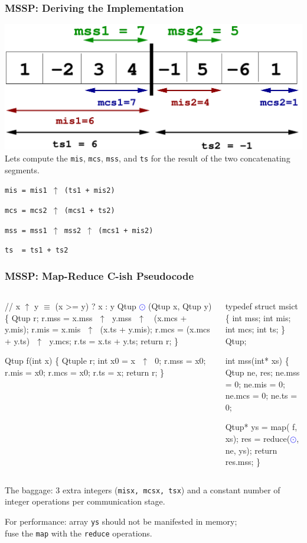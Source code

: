 \documentclass{beamer}
\newcommand{\blue}[1]{\textcolor{Blue}{{#1}}}
\renewcommand{\emph}[1]{\textcolor{CosGreen}{ #1}}
\newcommand{\emp}[1]{\textcolor{DikuRed}{ #1}}
\newcommand{\mymath}[1]{$ #1 $}
\begin{document}
\begin{frame}[fragile,t]
  \frametitle{MSSP: Deriving the Implementation}

\includegraphics[height=22ex]{img/day3/mssp2}
\medskip
Lets compute the {\tt mis}, {\tt mcs}, {\tt mss}, and {\tt ts} for
the result of the two concatenating segments.

\bigskip
{\tt mis = \pause mis1 $\uparrow$ (ts1 + mis2)}
\medskip

{\tt mcs = \pause mcs2 $\uparrow$ (mcs1 + ts2)}
\medskip

{\tt mss = \pause mss1 $\uparrow$ mss2 $\uparrow$ (mcs1 + mis2)}
\medskip

{\tt ts~~= ts1 + ts2}
\end{frame}


\begin{frame}[fragile,t]
  \frametitle{MSSP: Map-Reduce C-ish Pseudocode}

\begin{columns}
\begin{colorcode}
// x \mymath{\uparrow} y \mymath{\equiv} (x >= y) ? x : y
Qtup \blue{\mymath{\odot}} (Qtup x, Qtup y) \{
    Qtup r;
    r.mss = x.mss\mymath{\mbox{ }\uparrow\mbox{ }}y.mss\mymath{\mbox{ }\uparrow\mbox{ }}
            (x.mcs + y.mis);
    r.mis = x.mis\mymath{\mbox{ }\uparrow\mbox{ }}(x.ts + y.mis);
    r.mcs = (x.mcs + y.ts)\mymath{\mbox{ }\uparrow\mbox{ }}y.mcs;
    r.ts  = x.ts + y.ts;
    return r;
\}

Qtup \emp{f}(int x) \{
    Qtuple r;
    int x0 = x\mymath{\mbox{ }\uparrow\mbox{ }}0;
    r.mss = x0; r.mis = x0;
    r.mcs = x0; r.ts = x;
    return r;
\}
\end{colorcode}
\begin{colorcode}
typedef struct msict \{
  int mss;
  int mis;
  int mcs;
  int ts;
\} Qtup;

int mss(int* xs) \{
    Qtup ne, res; 
    ne.mss = 0; ne.mis = 0;
    ne.mcs = 0; ne.ts  = 0;
    
    Qtup* ys = \emph{map}(\emp{f}, xs);
    res = \emph{reduce}(\blue{\mymath{\odot}}, ne, ys);
    return res.mss;
\}
\end{colorcode}
\end{columns}
\smallskip

The baggage: $3$ extra integers ({\tt misx, mcsx, tsx}) 
and a constant number of integer operations per communication stage. 
\medskip

\emp{For performance:} array {\tt ys} should not be manifested in memory;\\
fuse the {\tt map} with the {\tt reduce} operations.

\end{frame}
\end{document}

